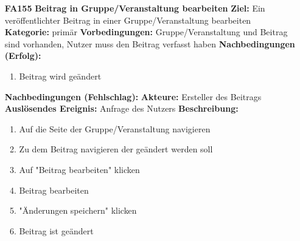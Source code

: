 \documentclass[parskip=full]{scrartcl}
\begin{document}
\begin{itemize}[nosep]
			\item[\textbf{FA155}]\textbf{Beitrag in Gruppe/Veranstaltung bearbeiten}
			\newline \textbf{Ziel:} Ein veröffentlichter Beitrag in einer Gruppe/Veranstaltung bearbeiten
			\newline \textbf{Kategorie:} primär
			\newline \textbf{Vorbedingungen:} Gruppe/Veranstaltung und Beitrag sind vorhanden, Nutzer muss den Beitrag verfasst haben
			\newline \textbf{Nachbedingungen (Erfolg):}
			\begin{enumerate}[nosep]
				\item Beitrag wird geändert
			\end{enumerate}
			\textbf{Nachbedingungen (Fehlschlag):}
			\newline \textbf{Akteure:} Ersteller des Beitrags
			\newline \textbf{Auslösendes Ereignis:} Anfrage des Nutzers
			\newline \textbf{Beschreibung:}
			\begin{enumerate}[nosep]
				\item Auf die Seite der Gruppe/Veranstaltung navigieren
				\item Zu dem Beitrag navigieren der geändert werden soll
				\item Auf "Beitrag bearbeiten" klicken
				\item Beitrag bearbeiten
				\item "Änderungen speichern" klicken
				\item Beitrag ist geändert\\
			\end{enumerate}
	

\end{itemize}
\end{document}
